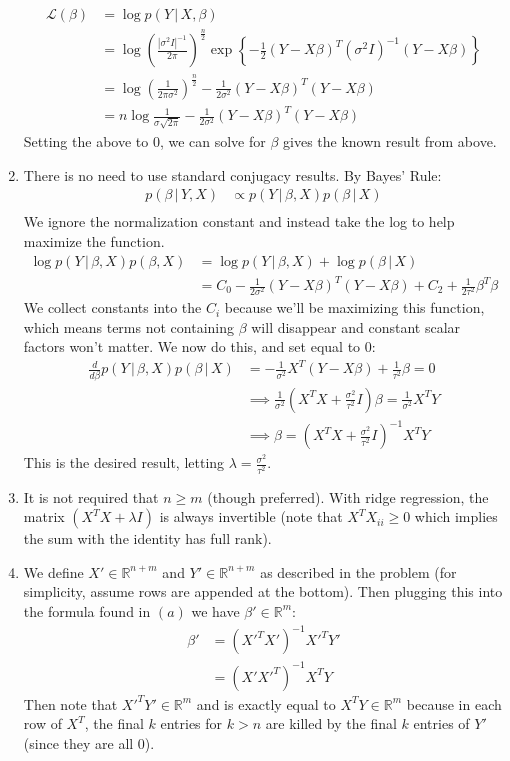 \documentclass[submit]{harvardml}
\newcommand{\given}{\,|\,}
\theoremstyle{plain}
\begin{document}
\begin{enumerate}[label=(\alph*)]
\begin{align*}
\mathcal{L}(\beta) &= \log p(Y \given X, \beta) \\
&= \log \left(\frac{|\sigma^2 I|^{-1}}{2\pi}\right)^{\frac{n}{2}} \exp \left\{-\frac{1}{2} (Y - X\beta)^T(\sigma^2 I)^{-1}(Y-X\beta) \right\} \\
&= \log \left(\frac{1}{2\pi\sigma^2}\right)^{\frac{n}{2}} - \frac{1}{2\sigma^2}(Y-X\beta)^T(Y -X\beta) \\
&= n \log \frac{1}{\sigma\sqrt{2\pi}} - \frac{1}{2\sigma^2}(Y- X\beta)^T(Y - X\beta)
\end{align*}
Setting the above to $0$, we can solve for $\beta$ gives the known result from above.

\item There is no need to use standard conjugacy results. By Bayes' Rule:
\begin{align*}
p(\beta \given Y,X) &\propto p(Y \given \beta,X) p(\beta \given X) \\
\end{align*}
We ignore the normalization constant and instead take the log to help maximize the function.
\begin{align*}
\log p(Y \given \beta, X)p(\beta, X) &= \log p(Y \given \beta, X) + \log p(\beta \given X) \\
&= C_0 - \frac{1}{2\sigma^2}(Y - X\beta)^T(Y - X\beta) + C_2 + \frac{1}{2\tau^2}\beta^T\beta
\end{align*}
We collect constants into the $C_i$ because we'll be maximizing this function, which means terms not containing $\beta$ will disappear and constant scalar factors won't matter. We now do this, and set equal to $0$:
\begin{align*}
\frac{d}{d\beta} p(Y \given \beta,X)p(\beta \given X) &= -\frac{1}{\sigma^2}X^T(Y - X\beta) + \frac{1}{\tau^2}\beta = 0\\
&\implies \frac{1}{\sigma^2}(X^TX + \frac{\sigma^2}{\tau^2}I)\beta = \frac{1}{\sigma^2}X^TY \\
&\implies \beta = (X^TX + \frac{\sigma^2}{\tau^2}I)^{-1}X^TY
\end{align*}
This is the desired result, letting $\lambda = \frac{\sigma^2}{\tau^2}$.

\item It is not required that $n \geq m$ (though preferred). With ridge regression, the matrix $(X^TX + \lambda I)$ is always invertible (note that $X^TX_{ii} \geq 0$ which implies the sum with the identity has full rank).
\item We define $X' \in \mathbb{R}^{n+m}$ and $Y' \in \mathbb{R}^{n+m}$ as described in the problem (for simplicity, assume rows are appended at the bottom). Then plugging this into the formula found in $(a)$ we have $\beta' \in \mathbb{R}^m$:
\begin{align*}
\beta' &= (X'^TX')^{-1}X'^TY' \\
&= (X'X'^T)^{-1}X^TY
\end{align*}
Then note that $X'^TY' \in \mathbb{R}^m$ and is exactly equal to $X^TY \in \mathbb{R}^m$ because in each row of $X^T$, the final $k$ entries for $k > n$  are killed by the final $k$ entries of $Y'$ (since they are all $0$).


\end{enumerate}
\end{document}
